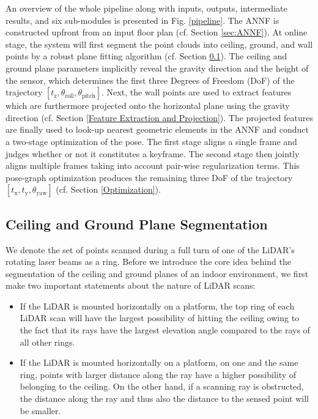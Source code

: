 \documentclass[letterpaper, 10 pt, conference]{ieeeconf}  %
\begin{document}
An overview of the whole pipeline along with inputs, outputs, intermediate results, and six sub-modules is presented in Fig. \ref{pipeline}. The ANNF is constructed upfront from an input floor plan (cf. Section \ref{sec:ANNF}). At online stage, the system will first segment the point clouds into ceiling, ground, and wall points by a robust plane fitting algorithm (cf. Section \ref{Segmentation}). The ceiling and ground plane parameters implicitly reveal the gravity direction and the height of the sensor, which determines the first three Degrees of Freedom (DoF) of the trajectory $[t_\text{z}, \theta_{\text{roll}}, \theta_{\text{pitch}}]$. Next, the wall points are used to extract features which are furthermore projected onto the horizontal plane using the gravity direction (cf. Section \ref{Feature Extraction and Projection}). The projected features are finally used to look-up nearest geometric elements in the ANNF and conduct a two-stage optimization of the pose. The first stage aligns a single frame and judges whether or not it constitutes a keyframe. The second stage then jointly aligns multiple frames taking into account pair-wise regularization terms. This pose-graph optimization produces the remaining three DoF of the trajectory $[t_\text{x}, t_\text{y}, \theta_{\text{yaw}}]$ (cf. Section \ref{Optimization}).

\subsection{Ceiling and Ground Plane Segmentation}
\label{Segmentation}

We denote the set of points scanned during a full turn of one of the LiDAR's rotating laser beams as a ring.
Before we introduce the core idea behind the segmentation of the ceiling and ground planes of an indoor environment, we first make two important statements about the nature of LiDAR scans:

\begin{itemize}
\item If the LiDAR is mounted horizontally on a platform, the top ring of each LiDAR scan will have the largest possibility of hitting the ceiling owing to the fact that its rays have the largest elevation angle compared to the rays of all other rings.
\item If the LiDAR is mounted horizontally on a platform, on one and the same ring, points with larger distance along the ray have a higher possibility of belonging to the ceiling. On the other hand, if a scanning ray is obstructed, the distance along the ray and thus also the distance to the sensed point will be smaller.
\end{itemize}
\end{document}
